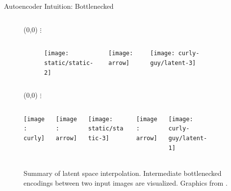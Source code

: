 \begin{frame}{Autoencoder Intuition: Bottlenecked}
\begin{figure}
\begin{columns}
\begin{column}{0.6\textwidth}
  \makebox(0,0){
    $\bm{\vdots}$
  }

  \vspace*{3.25ex}

  \begin{columns}
  \begin{column}{0.225\textwidth}
  \end{column}
  \begin{column}{0.2\textwidth}
  \end{column}
  \begin{column}{0.15\textwidth}
  \centering
  \texttt{[image: static/static-2]}
  \end{column}
  \begin{column}{0.2\textwidth}
  \centering
  \texttt{[image: arrow]}
  \end{column}
  \begin{column}{0.225\textwidth}
  \centering
  \texttt{[image: curly-guy/latent-3]}
  \end{column}
  \end{columns}

  \vspace*{1.5ex}

  \makebox(0,0){
    $\bm{\vdots}$
  }

  \vspace*{3.25ex}

  \begin{columns}
  \begin{column}{0.225\textwidth}
  \centering
  \texttt{[image: curly]}
  \end{column}
  \begin{column}{0.2\textwidth}
  \centering
  \texttt{[image: arrow]}
  \end{column}
  \begin{column}{0.15\textwidth}
  \texttt{[image: static/static-3]}
  \end{column}
  \begin{column}{0.2\textwidth}
  \centering
  \texttt{[image: arrow]}
  \end{column}
  \begin{column}{0.225\textwidth}
  \centering
  \texttt{[image: curly-guy/latent-1]}
  \end{column}
  \end{columns}

  \end{column}
  \begin{column}{0.03\textwidth}
  \end{column}
  \begin{column}{0.3\textwidth}
  \caption{
  ~\\
  Summary of latent space interpolation.
  Intermediate bottlenecked encodings between two input images are visualized.
  Graphics from \cite{white2016sampling}.
  }
  \end{column}
  \end{columns}

\end{figure}

\end{frame}

